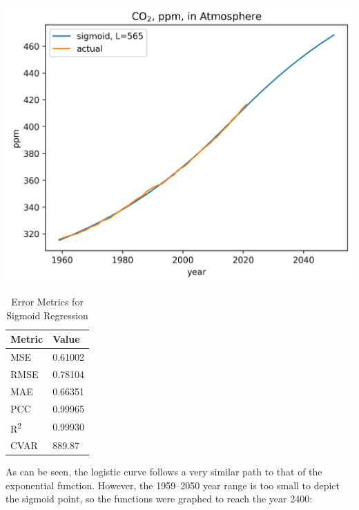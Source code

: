 \documentclass{mcmthesis}
\begin{document}
    \begin{table}[h]
        \begin{minipage}{0.7\linewidth}
            \centering
            \includegraphics[width=\textwidth]{co2_sigm_565}%
            \label{fig:co2_logi}
        \end{minipage}%
        \begin{minipage}{0.3\linewidth}
            \centering
            \begin{tabular}{ll}
                \toprule
                Metric               & Value   \\
                \midrule
                MSE                  & 0.61002 \\
                RMSE                 & 0.78104 \\
                MAE                  & 0.66351 \\
                PCC                  & 0.99965 \\
                R\textsuperscript{2} & 0.99930 \\
                CVAR                 & 889.87  \\
                \bottomrule
            \end{tabular}
            \caption{Error Metrics for Sigmoid Regression}
            \label{tab:co2_logi_err}
        \end{minipage}
    \end{table}

    As can be seen, the logistic curve follows a very similar path to that of the exponential function. However, the 1959--2050 year range is too small to depict the sigmoid point, so the functions were graphed to reach the year 2400:
\end{document}

